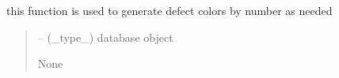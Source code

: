 \documentclass[letterpaper,10pt,english]{sphinxmanual}
\begin{document}
\begin{savenotes}\begin{fulllineitems}
\label{\detokenize{setting/backend/defect_management_funcs:oxin.backend.defect_management_funcs.generate_defect_colors}}
\pysigstartsignatures
{}
\pysigstopsignatures
\sphinxAtStartPar
this function is used to generate defect colors by number as needed
\begin{quote}\begin{description}
\sphinxAtStartPar
{} – (\_type\_) database object

\sphinxAtStartPar
None

\end{description}\end{quote}

\end{fulllineitems}\end{savenotes}

\end{document}

